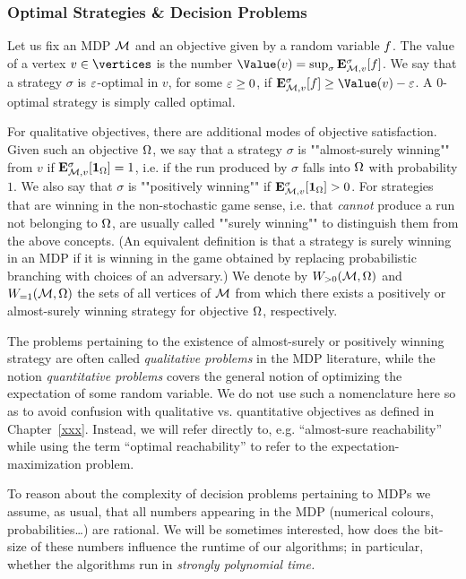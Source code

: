 \subsubsection*{Optimal Strategies \& Decision Problems}

Let us fix an MDP $\mathcal{M}$ and an objective given by a random variable 
$f$. The value of a vertex $v\in\vertices$ is the number 
$\Value(v)=\sup_{\sigma} \expv^{\sigma}_{\mdp,v}[\quantObj]$. We say that a strategy $\sigma$ is $\varepsilon$-optimal in $v$, for some $\varepsilon\geq 0$, if $\expv^{\sigma}_{\mdp,v}[\quantObj] \geq \Value(v) - \eps$. A $0$-optimal strategy is simply called optimal. 

For qualitative objectives, there are additional modes of objective satisfaction. Given such an objective $\Omega$, we say that a strategy $\sigma$ is ""almost-surely winning"" from $v$ if $\mathbf{E}^{\sigma}_{\mathcal{M},v}[\mathbf{1}_{\Omega}]=1$, i.e. if the run produced by $\sigma$ falls into $\Omega$ with probability $1$. We also say that $\sigma$ is ""positively winning"" if $\mathbf{E}^{\sigma}_{\mathcal{M},v}[\mathbf{1}_{\Omega}]>0$. For strategies that are winning in the non-stochastic game sense, i.e. that \emph{cannot} produce a run not belonging to $\Omega$, are usually called ""surely winning"" to distinguish them from the above concepts. (An equivalent definition is that a strategy is surely winning in an MDP if it is winning in the game obtained by replacing probabilistic branching with choices of an adversary.) We denote by $W_{>0}(\mathcal{M},\Omega)$ and $W_{=1}(\mathcal{M},\Omega)$ the sets of all vertices of $\mathcal{M}$ from which there exists a positively or almost-surely winning strategy for objective $\Omega$, respectively.

The problems pertaining to the existence of almost-surely or positively winning strategy are often called \emph{qualitative problems} in the MDP literature, while the notion \emph{quantitative problems} covers the general notion of optimizing the expectation of some random variable. We do not use such a nomenclature here so as to avoid confusion with qualitative vs. quantitative objectives as defined in Chapter~\cref{xxx}. Instead, we will refer directly to, e.g. ``almost-sure reachability'' while using the term ``optimal reachability'' to refer to the expectation-maximization problem.

To reason about the complexity of decision problems pertaining to MDPs we assume, as usual, that all numbers appearing in the MDP (numerical colours, probabilities\ldots) are rational. We will be sometimes interested, how does the bit-size of these numbers influence the runtime of our algorithms; in particular, whether the algorithms run in \emph{strongly polynomial time.}

